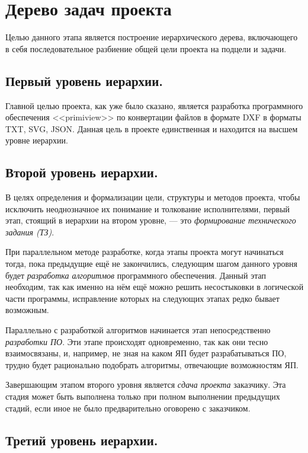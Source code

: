 \section{Дерево задач проекта}

Целью данного этапа является построение иерархического дерева, включающего в себя последовательное разбиение общей цели проекта на подцели и задачи.

\subsection{Первый уровень иерархии.}

Главной целью проекта, как уже было сказано, является разработка программного обеспечения <<primiview>> по конвертации файлов в формате DXF в форматы TXT, SVG, JSON. Данная цель в проекте единственная и находится на высшем уровне иерархии.

\subsection{Второй уровень иерархии.}

В целях определения и формализации цели, структуры и методов проекта, чтобы исключить неоднозначное их понимание и толкование исполнителями, первый этап, стоящий в иерархии на втором уровне, --- это \textit{формирование технического задания (ТЗ)}.

При параллельном методе разработке, когда этапы проекта могут начинаться тогда, пока предыдущие ещё не закончились, следующим шагом данного уровня будет \textit{разработка алгоритмов} программного обеспечения. Данный этап необходим, так как именно на нём ещё можно решить несостыковки в логической части программы, исправление которых на следующих этапах редко бывает возможным.

Параллельно с разработкой алгоритмов начинается этап непосредственно \textit{разработки ПО}. Эти этапе происходят одновременно, так как они тесно взаимосвязаны, и, например, не зная на каком ЯП будет разрабатываться ПО, трудно будет рационально подобрать алгоритмы, отвечающие возможностям ЯП.

Завершающим этапом второго уровня является \textit{сдача проекта} заказчику. Эта стадия может быть выполнена только при полном выполнении предыдущих стадий, если иное не было предварительно оговорено с заказчиком.

\subsection{Третий уровень иерархии.}


